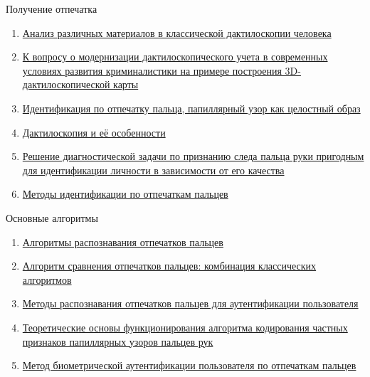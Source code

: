 \documentclass{article}
\begin{document}
Получение отпечатка \\
\begin{enumerate}
     \item \href{https://elibrary.ru/download/elibrary_50506717_45015847.pdf}{Анализ различных материалов в классической дактилоскопии человека}
     \item \href{https://elibrary.ru/download/elibrary_39657698_78801553.pdf}{К вопросу о модернизации дактилоскопического учета в современных условиях развития криминалистики на примере построения 3D-дактилоскопической карты}
     \item \href{https://elibrary.ru/download/elibrary_54061151_92328469.pdf#page=87}{Идентификация по отпечатку пальца, папиллярный узор как целостный образ}
     \item \href{https://elibrary.ru/download/elibrary_41857591_46698129.pdf}{Дактилоскопия и её особенности}
     \item \href{https://elib.institutemvd.by/jspui/bitstream/MVD_NAM/8521/1/Yumatov%20S.%20V..pdf}{Решение диагностической задачи по признанию следа пальца руки пригодным для идентификации личности в зависимости от его качества}
     \item \href{https://network-journal.mpei.ac.ru/ru/27/13/6/article.htm}{Методы идентификации по отпечаткам пальцев}
\end{enumerate}
Основные алгоритмы \\
\begin{enumerate}
     \item \href{https://cyberleninka.ru/article/n/algoritmy-raspoznavaniya-otpechatkov-paltsev}{Алгоритмы распознавания отпечатков пальцев}
     \item \href{https://habr.com/ru/companies/samsung/articles/842578/}{Алгоритм сравнения отпечатков пальцев: комбинация классических алгоритмов}
     \item \href{https://www.elibrary.ru/download/elibrary_42560367_93751199.pdf}{Методы распознавания отпечатков пальцев для аутентификации пользователя}
     \item \href{https://elibrary.ru/download/elibrary_44466095_76421639.pdf}{Теоретические основы функционирования алгоритма кодирования частных признаков папиллярных узоров пальцев рук}
     \item \href{https://elibrary.ru/download/elibrary_24994983_78627145.pdf}{Метод биометрической аутентификации пользователя по отпечаткам пальцев}
     
\end{enumerate}
\end{document}
